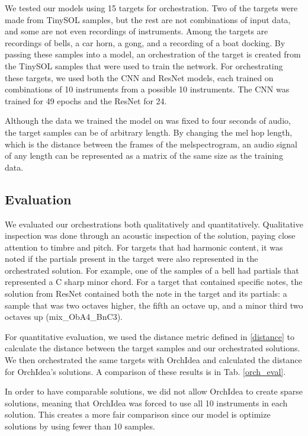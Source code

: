 \documentclass{article}
\begin{document}
We tested our models using 15 targets for orchestration. Two of the targets were made from TinySOL samples, but the rest are not combinations of input data, and some are not even recordings of instruments. Among the targets are recordings of bells, a car horn, a gong, and a recording of a boat docking. By passing these samples into a model, an orchestration of the target is created from the TinySOL samples that were used to train the network. For orchestrating these targets, we used both the CNN and ResNet models, each trained on combinations of 10 instruments from a possible 10 instruments. The CNN was trained for 49 epochs and the ResNet for 24.

Although the data we trained the model on was fixed to four seconds of audio, the target samples can be of arbitrary length. By changing the mel hop length, which is the distance between the frames of the melspectrogram, an audio signal of any length can be represented as a matrix of the same size as the training data.

\subsection{Evaluation}

We evaluated our orchestrations both qualitatively and quantitatively. Qualitative inspection was done through an acoustic inspection of the solution, paying close attention to timbre and pitch. For targets that had harmonic content, it was noted if the partials present in the target were also represented in the orchestrated solution. For example, one of the samples of a bell had partials that represented a C sharp minor chord. For a target that contained specific notes, the solution from ResNet contained both the note in the target and its partials: a sample that was two octaves higher, the fifth an octave up, and a minor third two octaves up (mix\_ObA4\_BnC3).

For quantitative evaluation, we used the distance metric defined in \eqref{distance} to calculate the distance between the target samples and our orchestrated solutions. We then orchestrated the same targets with OrchIdea and calculated the distance for OrchIdea's solutions. A comparison of these results is in Tab. \ref{orch_eval}.

In order to have comparable solutions, we did not allow OrchIdea to create sparse solutions, meaning that OrchIdea was forced to use all 10 instruments in each solution. This creates a more fair comparison since our model is optimize solutions by using fewer than 10 samples.
\end{document}
